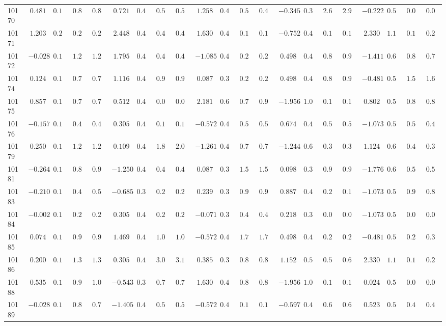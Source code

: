 \documentclass[6pt]{article}
\begin{document}
\begin{landscape}
{\begin{longtable}{lrrrrrrrrrrrrrrrrrrrr}
10170&$ 0.481$&$0.164$&$0.870$&$0.875$&$ 0.721$&$0.443$&$0.521$&$0.550$&$ 1.258$&$0.420$&$0.508$&$0.499$&$-0.345$&$0.363$&$2.636$&$2.908$&$-0.222$&$0.517$&$0.021$&$0.023$\tabularnewline
10171&$ 1.203$&$0.219$&$0.256$&$0.237$&$ 2.448$&$0.432$&$0.483$&$0.493$&$ 1.630$&$0.478$&$0.173$&$0.149$&$-0.752$&$0.439$&$0.195$&$0.193$&$ 2.330$&$1.198$&$0.174$&$0.222$\tabularnewline
10172&$-0.028$&$0.161$&$1.282$&$1.267$&$ 1.795$&$0.408$&$0.438$&$0.421$&$-1.085$&$0.424$&$0.263$&$0.263$&$ 0.498$&$0.411$&$0.878$&$0.972$&$-1.411$&$0.601$&$0.874$&$0.793$\tabularnewline
10174&$ 0.124$&$0.160$&$0.770$&$0.753$&$ 1.116$&$0.430$&$0.972$&$0.972$&$ 0.087$&$0.394$&$0.204$&$0.204$&$ 0.498$&$0.411$&$0.878$&$0.972$&$-0.481$&$0.528$&$1.531$&$1.646$\tabularnewline
10175&$ 0.857$&$0.183$&$0.700$&$0.702$&$ 0.512$&$0.443$&$0.056$&$0.057$&$ 2.181$&$0.619$&$0.786$&$0.940$&$-1.956$&$1.082$&$0.145$&$0.149$&$ 0.802$&$0.573$&$0.820$&$0.881$\tabularnewline
10176&$-0.157$&$0.163$&$0.439$&$0.440$&$ 0.305$&$0.437$&$0.108$&$0.111$&$-0.572$&$0.411$&$0.598$&$0.594$&$ 0.674$&$0.445$&$0.545$&$0.580$&$-1.073$&$0.572$&$0.522$&$0.488$\tabularnewline
10179&$ 0.250$&$0.160$&$1.246$&$1.264$&$ 0.109$&$0.427$&$1.898$&$2.006$&$-1.261$&$0.432$&$0.735$&$0.716$&$-1.244$&$0.630$&$0.355$&$0.367$&$ 1.124$&$0.635$&$0.419$&$0.328$\tabularnewline
10181&$-0.264$&$0.166$&$0.870$&$0.907$&$-1.250$&$0.401$&$0.482$&$0.485$&$ 0.087$&$0.394$&$1.561$&$1.586$&$ 0.098$&$0.359$&$0.958$&$0.930$&$-1.776$&$0.641$&$0.547$&$0.523$\tabularnewline
10183&$-0.210$&$0.164$&$0.492$&$0.501$&$-0.685$&$0.385$&$0.208$&$0.209$&$ 0.239$&$0.389$&$0.914$&$0.932$&$ 0.887$&$0.493$&$0.215$&$0.187$&$-1.073$&$0.572$&$0.919$&$0.864$\tabularnewline
10184&$-0.002$&$0.160$&$0.269$&$0.265$&$ 0.305$&$0.437$&$0.212$&$0.212$&$-0.071$&$0.399$&$0.426$&$0.432$&$ 0.218$&$0.370$&$0.074$&$0.071$&$-1.073$&$0.572$&$0.023$&$0.023$\tabularnewline
10185&$ 0.074$&$0.160$&$0.992$&$0.981$&$ 1.469$&$0.415$&$1.025$&$1.037$&$-0.572$&$0.411$&$1.788$&$1.777$&$ 0.498$&$0.411$&$0.292$&$0.281$&$-0.481$&$0.528$&$0.296$&$0.316$\tabularnewline
10186&$ 0.200$&$0.160$&$1.326$&$1.329$&$ 0.305$&$0.437$&$3.062$&$3.146$&$ 0.385$&$0.386$&$0.850$&$0.869$&$ 1.152$&$0.567$&$0.537$&$0.601$&$ 2.330$&$1.198$&$0.174$&$0.222$\tabularnewline
10188&$ 0.535$&$0.165$&$0.967$&$1.006$&$-0.543$&$0.389$&$0.755$&$0.787$&$ 1.630$&$0.478$&$0.878$&$0.864$&$-1.956$&$1.082$&$0.145$&$0.149$&$ 0.024$&$0.513$&$0.072$&$0.072$\tabularnewline
10189&$-0.028$&$0.161$&$0.808$&$0.797$&$-1.405$&$0.416$&$0.537$&$0.560$&$-0.572$&$0.411$&$0.191$&$0.192$&$-0.597$&$0.401$&$0.637$&$0.671$&$ 0.523$&$0.538$&$0.454$&$0.415$\tabularnewline

\end{longtable}}
\end{landscape}
\end{document}
